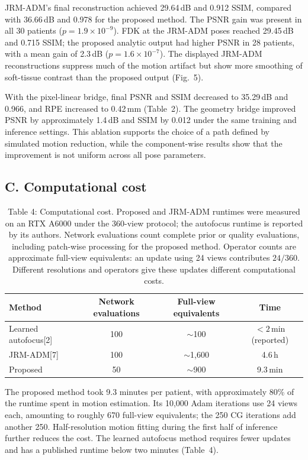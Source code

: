 \documentclass[11pt]{article}
\begin{document}
JRM-ADM's final reconstruction achieved 29.64\,dB and 0.912 SSIM, compared with
36.66\,dB and 0.978 for the proposed method. The PSNR gain was present in all
30 patients ($p=1.9\times10^{-9}$). FDK at the JRM-ADM poses reached
29.45\,dB and 0.715 SSIM; the proposed analytic output had higher PSNR in 28
patients, with a mean gain of 2.3\,dB ($p=1.6\times10^{-7}$).
The displayed JRM-ADM reconstructions suppress much of the motion artifact but show
more smoothing of soft-tissue contrast than the proposed output
(Fig.~5).

With the pixel-linear bridge, final PSNR and SSIM decreased to 35.29\,dB and 0.966,
and RPE increased to 0.42\,mm (Table~2). The geometry bridge improved
PSNR by approximately 1.4\,dB and SSIM by 0.012 under the same training and inference
settings. This ablation supports the choice of a path defined by simulated motion
reduction, while the component-wise results show that the improvement is not uniform
across all pose parameters.

\FloatBarrier
\subsection{C. Computational cost}


\begin{table}[H]
\centering
\caption{Table 4: Computational cost. Proposed and JRM-ADM runtimes were measured on an RTX A6000
under the 360-view protocol; the autofocus runtime is reported by its authors.
Network evaluations count complete prior or quality evaluations, including patch-wise
processing for the proposed method. Operator counts are approximate full-view
equivalents: an update using 24 views contributes $24/360$. Different resolutions and
operators give these updates different computational costs.}


\small
\begin{tabular}{lccc}
\toprule
Method & Network evaluations & Full-view equivalents & Time \\
\midrule
Learned autofocus[2] & 100 & $\sim$100 & $<2$\,min (reported) \\
JRM-ADM[7] & 100 & $\sim$1{,}600 & 4.6\,h \\
Proposed & 50 & $\sim$900 & 9.3\,min \\
\bottomrule
\end{tabular}
\end{table}

The proposed method took 9.3 minutes per patient, with approximately 80\% of the
runtime spent in motion estimation. Its 10,000 Adam iterations use 24 views each,
amounting to roughly 670 full-view equivalents; the 250 CG iterations add another
250. Half-resolution motion fitting during the first half of inference further reduces
the cost. The learned autofocus method requires fewer updates and has a published
runtime below two minutes (Table~4).
\end{document}

